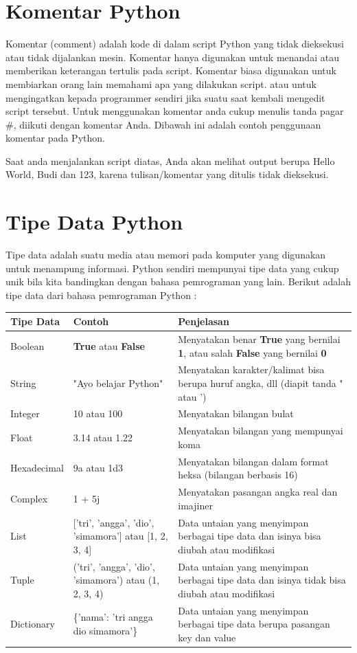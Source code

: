 \section{Komentar Python}
Komentar (comment) adalah kode di dalam script Python yang tidak dieksekusi atau tidak dijalankan mesin. Komentar hanya digunakan untuk menandai atau memberikan keterangan tertulis pada script. Komentar biasa digunakan untuk membiarkan orang lain memahami apa yang dilakukan script. atau untuk mengingatkan kepada programmer sendiri jika suatu saat kembali mengedit script tersebut. Untuk menggunakan komentar anda cukup menulis tanda pagar \#, diikuti dengan komentar Anda. Dibawah ini adalah contoh penggunaan komentar pada Python.

Saat anda menjalankan script diatas, Anda akan melihat output berupa Hello World, Budi dan 123, karena tulisan/komentar yang ditulis tidak dieksekusi.

\section{Tipe Data Python}
Tipe data adalah suatu media atau memori pada komputer yang digunakan untuk menampung informasi. Python sendiri mempunyai tipe data yang cukup unik bila kita bandingkan dengan bahasa pemrograman yang lain. Berikut adalah tipe data dari bahasa pemrograman Python :

\begin{center}
\begin{tabular}{ | m{2cm} | m{2cm} | m{7cm} | }
\hline
Tipe Data & Contoh & Penjelasan \\
\hline
Boolean & \textbf{True} atau \textbf{False} & Menyatakan benar \textbf{True} yang bernilai \textbf{1}, atau salah \textbf{False} yang bernilai \textbf{0} \\
\hline
String & "Ayo belajar Python" & Menyatakan karakter/kalimat bisa berupa huruf angka, dll (diapit tanda " atau ') \\
\hline
Integer & 10 atau 100 & Menyatakan bilangan bulat \\
\hline
Float & 3.14 atau 1.22 & Menyatakan bilangan yang mempunyai koma \\
\hline
Hexadecimal & 9a atau 1d3 & Menyatakan bilangan dalam format heksa (bilangan berbasis 16) \\
\hline
Complex & 1 + 5j & Menyatakan pasangan angka real dan imajiner \\
\hline
List & ['tri', 'angga', 'dio', 'simamora'] atau [1, 2, 3, 4] & Data untaian yang menyimpan berbagai tipe data dan isinya bisa diubah atau modifikasi \\
\hline
Tuple & ('tri', 'angga', 'dio', 'simamora') atau (1, 2, 3, 4) & Data untaian yang menyimpan berbagai tipe data dan isinya tidak bisa diubah atau modifikasi \\
\hline
Dictionary & \{'nama': 'tri angga dio simamora'\} & Data untaian yang menyimpan berbagai tipe data berupa pasangan key dan value \\
\hline
\end{tabular}
\end{center}

